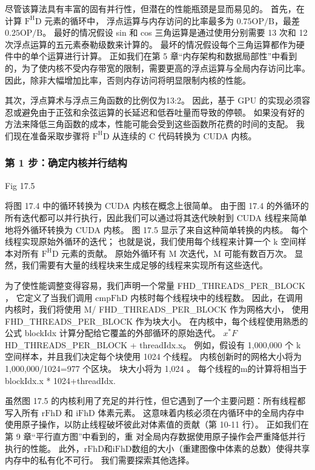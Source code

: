 尽管该算法具有丰富的固有并行性，但潜在的性能瓶颈是显而易见的。 
首先，在计算 $\mathrm{F}^{\mathrm{H}} \mathrm{D}$ 元素的循环中，
浮点运算与内存访问的比率最多为 $0.75 \mathrm{OP} / \mathrm{B}$，最差 $0.25 \mathrm{OP} / \mathrm{B}$。 
最好的情况假设 sin 和 cos 三角运算是通过使用分别需要 13 次和 12 次浮点运算的五元素泰勒级数来计算的。 
最坏的情况假设每个三角运算都作为硬件中的单个运算进行计算。 
正如我们在第 5 章“内存架构和数据局部性”中看到的，为了使内核不受内存带宽的限制，需要更高的浮点运算与全局内存访问比率。 
因此，除非大幅增加比率，否则内存访问将明显限制内核的性能。

其次，浮点算术与浮点三角函数的比例仅为13:2。 
因此，基于 GPU 的实现必须容忍或避免由于正弦和余弦运算的长延迟和低吞吐量而导致的停顿。 
如果没有好的方法来降低三角函数的成本，性能可能会受到这些函数所花费的时间的支配。 
我们现在准备采取步骤将 $\mathrm{F}^{\mathrm{H}} \mathrm{D}$ 从连续的 $\mathrm{C}$ 代码转换为 CUDA 内核。

\subsubsection{第 1 步：确定内核并行结构}
{\color{red} Fig 17.5}

将图 17.4 中的循环转换为 CUDA 内核在概念上很简单。 
由于图 17.4 的外循环的所有迭代都可以并行执行，因此我们可以通过将其迭代映射到 CUDA 线程来简单地将外循环转换为 CUDA 内核。 
图 17.5 显示了来自这种简单转换的内核。 每个线程实现原始外循环的迭代； 
也就是说，我们使用每个线程来计算一个 k 空间样本对所有 $\mathrm{F}^{\mathrm{H}} \mathrm{D}$ 元素的贡献。 
原始外循环有 $\mathrm{M}$ 次迭代，$\mathrm{M}$ 可能有数百万次。 
显然，我们需要有大量的线程块来生成足够的线程来实现所有这些迭代。

为了使性能调整变得容易，我们声明一个常量 FHD\_THREADS\_PER\_BLOCK ，
它定义了当我们调用 $\mathrm{cmpFhD}$ 内核时每个线程块中的线程数。 
因此，在调用内核时，我们将使用 M/ FHD\_THREADS\_PER\_BLOCK 作为网格大小，
使用 FHD\_THREADS\_PER\_BLOCK 作为块大小。 
在内核中，每个线程使用熟悉的公式 blockIdx 计算分配给它覆盖的外部循环的原始迭代。 
$x^{*} F$ HD\_THREADS\_PER\_BLOCK + threadIdx.x。 
例如，假设有 1,000,000 个 k 空间样本，并且我们决定每个块使用 1024 个线程。 
内核创新时的网格大小将为 1,000,000/1024=977 个区块。 块大小将为 1,024 。 
每个线程的$\mathrm{m}$的计算将相当于blockIdx.x * 1024+threadIdx.

虽然图 17.5 的内核利用了充足的并行性，但它遇到了一个主要问题：所有线程都写入所有 $\mathrm{rFhD}$ 
和 $\mathrm{iFhD}$ 体素元素。 
这意味着内核必须在内循环中的全局内存中使用原子操作，以防止线程破坏彼此对体素值的贡献（第 10-11 行）。 
正如我们在第 9 章“平行直方图”中看到的，重
对全局内存数据使用原子操作会严重降低并行执行的性能。 
此外，$\mathrm{rFhD}$和$\mathrm{iFhD}$数组的大小（重建图像中体素的总数）使得共享内存中的私有化不可行。 
我们需要探索其他选择。

